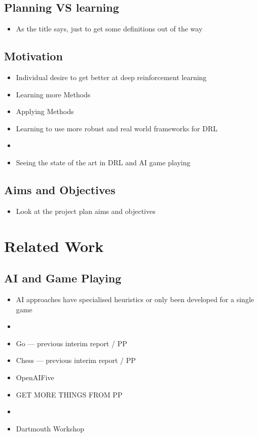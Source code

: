 \documentclass[a4paper]{article}
\begin{document}
\subsection{Planning VS learning}
\begin{itemize}
    \item As the title says, just to get some definitions out of the way
\end{itemize}
\subsection{Motivation}
\begin{itemize}
    \item Individual desire to get better at deep reinforcement learning
    \item Learning more Methods
    \item Applying Methods
    \item Learning to use more robust and real world frameworks for DRL
    \item
    \item Seeing the state of the art in DRL and AI game playing
\end{itemize}
\subsection{Aims and Objectives}
\begin{itemize}
    \item Look at the project plan aims and objectives
\end{itemize}

\section{Related Work}
\subsection{AI and Game Playing}
\begin{itemize}
    \item AI approaches have specialised heuristics or only been developed for a single game
    \item
    \item Go --- previous interim report / PP
    \item Chess --- previous interim report / PP
    \item OpenAIFive
    \item GET MORE THINGS FROM PP
    \item
    \item Dartmouth Workshop
\end{itemize}
\end{document}
